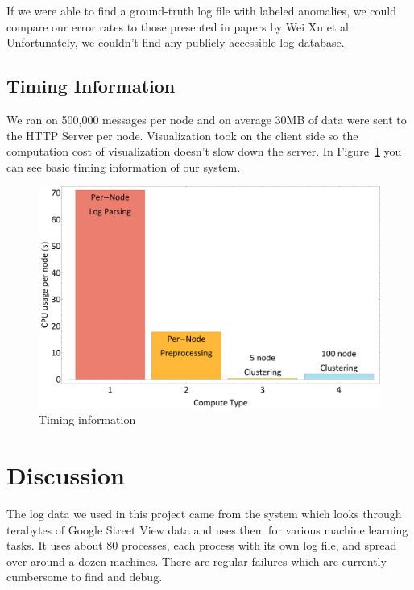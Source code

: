 \documentclass[conference]{acmsiggraph}
\begin{document}
If we were able to find a ground-truth log file with labeled anomalies, we could compare our error
rates to those presented in papers by Wei Xu et al. Unfortunately, we couldn't find any publicly
accessible log database.

\subsection{Timing Information}
We ran on 500,000 messages per node and on average 30MB of data were sent to the HTTP Server per
node. Visualization took on the client side so the computation cost of visualization doesn't slow
down the server. In Figure~\ref{fig:timings} you can see basic timing information of our system.

\begin{figure}[p]
    \centering
    \includegraphics[width=1.0\columnwidth]{images/timing.pdf}
    \caption{Timing information}
    \label{fig:timings}
\end{figure}


\section{Discussion}

The log data we used in this project came from the system which looks through terabytes of Google
Street View data and uses them for various machine learning tasks. It uses about 80 processes, each
process with its own log file, and spread over around a dozen machines. There are regular failures
which are currently cumbersome to find and debug.
\end{document}
